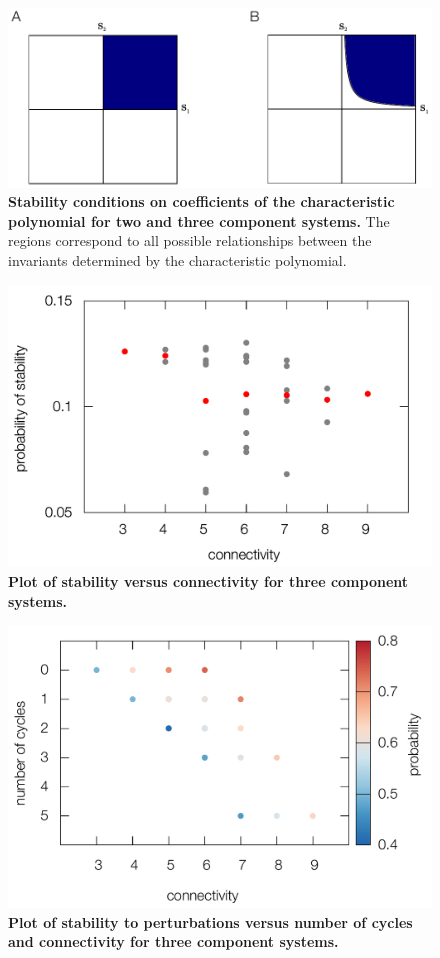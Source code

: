 \begin{figure}[!ht]
\centering
\noindent\includegraphics[width=0.8\columnwidth]{fig/region2and3.pdf}
\caption{{\bf Stability conditions on coefficients of the characteristic polynomial for two and three component systems.} The regions correspond to all possible relationships between the invariants determined by the characteristic polynomial.}
\label{fig:region2and3}
\end{figure}

\begin{figure}[!ht]
\centering
\noindent\includegraphics[width=0.8\columnwidth]{fig/apstab3x3.pdf}
\caption{{\bf Plot of stability versus connectivity for three component systems.} }
\label{fig:apstab3x3}
\end{figure}

\begin{figure}[!ht]
\centering
\noindent\includegraphics[width=0.8\columnwidth]{fig/connectcycle3D3x3.pdf}
\caption{{\bf Plot of stability to perturbations versus number of cycles and connectivity for three component systems.} }
\label{fig:connectcycle3D3x3}
\end{figure}

